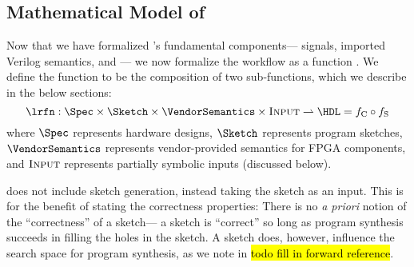 \subsection{Mathematical Model of \lr}
\label{sec:correctness-argument}

\newcommand{\SketchGenFn}{f_{\text{G}\xspace{}}}
\newcommand{\LRSynthFn}{f_{\text{S}\xspace{}}}
\newcommand{\HDLCompFn}{f_{\text{C}\xspace{}}}

Now that we have formalized
  \lr's fundamental components---%
  signals,
   imported Verilog semantics,
   and \lrir---%
  we now formalize the \lr workflow
  as a function \lrfn{}.
We define the function to be
the composition of two sub-functions, which we describe in the below sections:
$$\lrfn : \Spec \times \Sketch \times \VendorSemantics \times \textsc{Input} \rightharpoonup \HDL = \HDLCompFn \circ \LRSynthFn$$
where $\Spec$ represents hardware designs, $\Sketch$ represents program sketches, $\VendorSemantics$ represents vendor-provided semantics for FPGA components, and $\textsc{Input}$ represents partially symbolic inputs (discussed below).

\lrfn does not include sketch generation,
  instead taking the sketch as an input.
This is for the benefit of stating the correctness properties:
  There is no \textit{a priori} notion of the ``correctness'' of a sketch---%
  a sketch is ``correct'' 
  so long as program synthesis succeeds 
  in filling the holes in the sketch.
A sketch does, however, influence
  the search space for program synthesis, as we note in \hl{todo fill in forward reference}.
  




